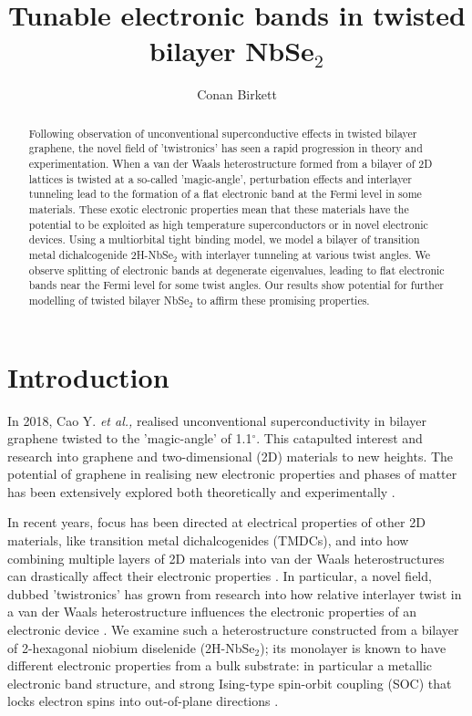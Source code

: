 \documentclass[12pt]{report} %
\title{\textbf{Tunable electronic bands in twisted bilayer NbSe$_2$}}
\author{Conan Birkett}
\affil{Department of Physics, University of Bath, Bath BA2 7AY, United Kingdom}
\begin{document}
\maketitle
\begin{abstract}
  Following observation of unconventional superconductive effects in twisted bilayer gra\-phene, the novel field of 'twistronics' has seen a rapid progression in theory and experimentation. When a van der Waals heterostructure formed from a bilayer of 2D lattices is twisted at a so-called 'magic-angle', perturbation effects and interlayer tunneling lead to the formation of a flat electronic band at the Fermi level in some materials. These exotic electronic properties mean that these materials have the potential to be exploited as high temperature superconductors or in novel electronic devices. Using a multiorbital tight binding model, we model a bilayer of transition metal dichalcogenide 2H-NbSe$_2$ with interlayer tunneling at various twist angles. We observe splitting of electronic bands at degenerate eigenvalues, leading to flat electronic bands near the Fermi level for some twist angles. Our results show potential for further modelling of twisted bilayer NbSe$_2$ to affirm these promising properties.
\end{abstract}

\newpage

\section*{Introduction}

  In 2018, Cao Y. \textit{et al.,} \cite{Cao2018} realised unconventional superconductivity in bilayer graphene twisted to the 'magic-angle' of 1.1$^\circ$. This catapulted interest and research into graphene and two-dimensional (2D) materials to new heights. The potential of graphene in realising new electronic properties and phases of matter has been extensively explored both theoretically and experimentally \cite{Cao2018, Ghuge2017, Bistritzer2010, Bistritzer2011, Geim2013, Gibney2019, Zou2018}.

  In recent years, focus has been directed at electrical properties of other 2D materials, like transition metal dichalcogenides (TMDCs), and into how combining multiple layers of 2D materials into van der Waals heterostructures can drastically affect their electronic properties \cite{Geim2013}. In particular, a novel field, dubbed 'twistronics' has grown from research into how relative interlayer twist in a van der Waals heterostructure influences the electronic properties of an electronic device \cite{Carr2017}. We examine such a heterostructure constructed from a bilayer of 2-hexagonal niobium diselenide (2H-NbSe$_2$); its monolayer is known to have different electronic properties from a bulk substrate: in particular a metallic electronic band structure, and strong Ising-type spin-orbit coupling (SOC) that locks electron spins into out-of-plane directions \cite{Nakata2016, Xi2016, He2018, Habara2021}.
\end{document}
